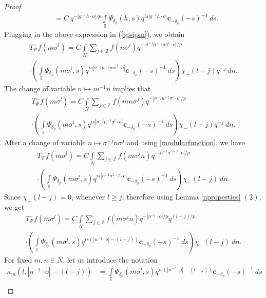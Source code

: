 \documentclass[12pt,reqno]{amsart}
\theoremstyle{definition}
\theoremstyle{definition}
\numberwithin{equation}{section}
\begin{document}
\begin{proof}
\begin{align*}
		&=C~q^{-|g^{-1}h\cdot o|/p}\int\limits_{\mathbb{T}}\Psi_{\delta_{p}}(h,s)q^{is|g^{-1}h\cdot o|}\mathbf{c}_{-\delta_{p}}(-s)^{-1}~ds.
	\end{align*}
Plugging in the above expression in (\ref{tpsipm}), we obtain
\begin{multline*}
T_{\Psi}^{-}f(m\sigma^{l})=C\int\limits_{N}\sum\limits_{j\in\mathbb{Z}}f(n\sigma^{j})q^{-|\sigma^{-j}n^{-1}m\sigma^{l}\cdot o|/p}\\
\cdot\left(\int\limits_{\mathbb{T}}\Psi_{\delta_{p}}(m\sigma^{l},s)q^{is|\sigma^{-j}n^{-1}m\sigma^{l}\cdot o|}\mathbf{c}_{-\delta_{p}}(-s)^{-1}~ds\right)\chi_{-}(l-j)q^{-j}~dn.
\end{multline*}
	The change of variable $n\mapsto m^{-1}n$ implies that
	\begin{multline*}
		T_{\Psi}^{-}f(m\sigma^{l})=C\int\limits_{N}\sum\limits_{j\in\mathbb{Z}}f(mn\sigma^{j})q^{-|\sigma^{-j}n^{-1}\sigma^{l}\cdot o|/p}\\
		\cdot\left(\int\limits_{\mathbb{T}}\Psi_{\delta_{p}}(m\sigma^{l},s)q^{is|\sigma^{-j}n^{-1}\sigma^{l}\cdot o|}\mathbf{c}_{-\delta_{p}}(-s)^{-1}~ds\right)\chi_{-}(l-j)q^{-j}~dn.
	\end{multline*}
After a change of variable $n\mapsto \sigma^{-j}n\sigma^{j}$ and using \eqref{modularfunction}, we have
	\begin{multline*}
		T_{\Psi}^{-}f(m\sigma^{l})=C\int\limits_{N}\sum\limits_{j\in\mathbb{Z}}f(m\sigma^{j}n)q^{-|n^{-1}\sigma^{l-j}\cdot o|/p}\\
		\cdot\left(\int\limits_{\mathbb{T}}\Psi_{\delta_{p}}(m\sigma^{l},s)q^{is|n^{-1}\sigma^{l-j}\cdot o|}\mathbf{c}_{-\delta_{p}}(-s)^{-1}~ds\right)\chi_{-}(l-j)~dn.
	\end{multline*}
Since $\chi_{-}(l-j)=0$, whenever $l\geq j$, therefore using Lemma \ref{nproperties} $(2)$, we get
	\begin{multline}\label{kappamkappamn}
		T_{\Psi}^{-}f(m\sigma^{l})=C\int\limits_{N}\sum\limits_{j\in\mathbb{Z}}f(m\sigma^{j}n)q^{-|n^{-1}\cdot o|/p}q^{(l-j)/p}\\
		\cdot\left(\int\limits_{\mathbb{T}}\Psi_{\delta_{p}}(m\sigma^{l},s)q^{is(|n^{-1}\cdot o|-(l-j))}\mathbf{c}_{-\delta_{p}}(-s)^{-1}~ds\right)\chi_{-}(l-j)~dn.
	\end{multline}
For fixed $m,n\in N$, let us introduce the notation
\begin{equation}\label{kappapdoz}
\begin{aligned}
\kappa_{m}(l,|n^{-1}\cdot o|-(l-j))&=\int\limits_{\mathbb{T}}\Psi_{\delta_{p}}(m\sigma^{l},s)q^{is(|n^{-1}\cdot o|-(l-j))}\mathbf{c}_{-\delta_{p}}(-s)^{-1}~ds\\

\end{aligned}
\end{equation}
\end{proof}
\end{document}
